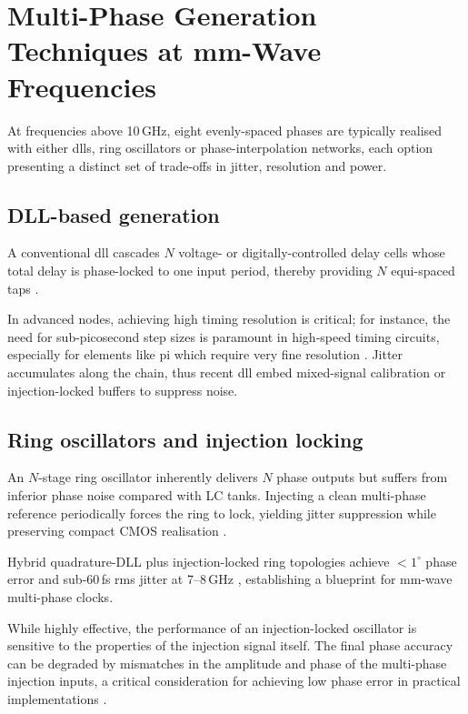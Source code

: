 
\section{Multi-Phase Generation Techniques at mm-Wave Frequencies}
At frequencies above 10\,GHz, eight evenly-spaced phases are typically realised with either \glspl{dll}, ring oscillators or phase-interpolation networks, each option presenting a distinct set of trade-offs in jitter, resolution and power.

\subsection{DLL-based generation}
A conventional \gls{dll} cascades $N$ voltage- or digitally-controlled delay cells whose total delay is phase-locked to one input period, thereby providing $N$ equi-spaced taps \cite{Wang2021JSSC}.

In advanced nodes, achieving high timing resolution is critical; for instance, the need for sub-picosecond step sizes is paramount in high-speed timing circuits, especially for elements like \gls{pi} which require very fine resolution \cite{Mishra2022ISSCC}.
Jitter accumulates along the chain, thus recent \gls{dll} embed mixed-signal calibration or injection-locked buffers to suppress noise.

\subsection{Ring oscillators and injection locking}
An $N$-stage ring oscillator inherently delivers $N$ phase outputs but suffers from inferior phase noise compared with LC tanks. Injecting a clean multi-phase reference periodically forces the ring to lock, yielding jitter suppression while preserving compact CMOS realisation \cite{Wang2021JSSC}.

Hybrid quadrature-DLL plus injection-locked ring topologies achieve $<\!1^{\circ}$ phase error and sub-60\,fs rms jitter at 7–8\,GHz \cite{Wang2021JSSC}, establishing a blueprint for mm-wave multi-phase clocks.

While highly effective, the performance of an injection-locked oscillator is sensitive to the properties of the injection signal itself. The final phase accuracy can be degraded by mismatches in the amplitude and phase of the multi-phase injection inputs, a critical consideration for achieving low phase error in practical implementations \cite{Wang2025ArXiv}.

